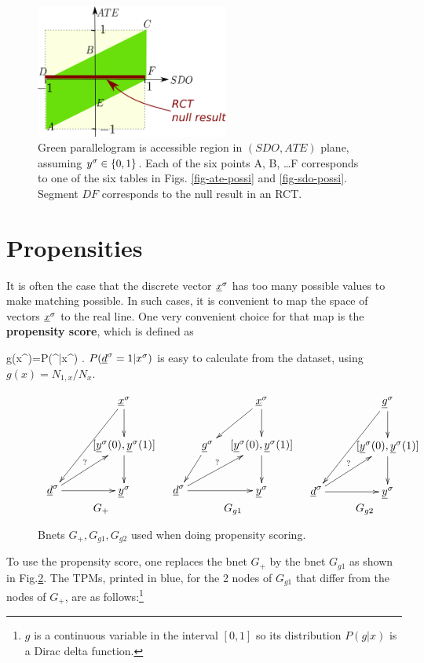 \begin{figure}[h!]
\centering
\includegraphics[width=2.5in]
{pot-out/sdo-ate-polytope.png}
\caption{
Green parallelogram
is accessible region in
$(SDO,ATE)$ plane,
assuming $y^\sigma\in \{0,1\}$.
Each of the
six points A, B, \ldots F
corresponds to one of the six tables
in Figs. \ref{fig-ate-possi}
and \ref{fig-sdo-possi}.
Segment $DF$
corresponds to the null
result in an RCT.
}
\label{fig-sdo-ate-polytope}
\end{figure}




\section{Propensities}\label{sec-propensities}

It is often the case
that the discrete vector $\rvx^\s$
has
too many possible values to make
matching possible.
In such cases, it
is convenient to
map the space
of vectors
$\rvx^\s$
to the real line.
One very
convenient choice
for that map
is the
{\bf propensity score},
which is defined as

\beq
g(x^\s)=P(\rvd^|x^\s)
\;.
\eeq
$P(\rvd^\s=1|x^\s)$ is easy to calculate
from the dataset, using $g(x)=N_{1,x}/N_x$.

\begin{figure}[h!]
$$
\begin{array}{ccc}
\xymatrix@C=.8pc{
&&\rvx^\s\ar[ddll]\ar[d]
\\
&&[\rvy^\s(0),\rvy^\s(1)]\ar[d]
\\
\rvd^\s\ar[urr]^?\ar[rr]
&
&\rvy^\s
}
&
\xymatrix@C=.8pc{
&&\rvx^\s\ar[dl]\ar[d]
\\
&\rvg^\s\ar[dl]
&[\rvy^\s(0),\rvy^\s(1)]\ar[d]
\\
\rvd^\s\ar[urr]^?\ar[rr]
&
&\rvy^\s
}
&
\xymatrix@C=.8pc{
&&\rvg^\s\ar[ddll]\ar[d]
\\
&&[\rvy^\s(0),\rvy^\s(1)]\ar[d]
\\
\rvd^\s\ar[urr]^?\ar[rr]
&
&\rvy^\s
}
\\
G_+&G_{g1}&G_{g2}
\end{array}
$$
\caption{Bnets $G_+, G_{g1}, G_{g2}$
used when doing propensity scoring.}
\label{fig-po-G-ps}
\end{figure}
To use the
propensity score,
one replaces the bnet $G_{+}$
by the bnet $G_{g1}$ as
shown in Fig.\ref{fig-po-G-ps}.
The TPMs, printed in blue,
for the 2 nodes of $G_{g1}$
that differ from the nodes
of $G_{+}$,
are as follows:\footnote{$g$ is a continuous variable
in the interval $[0,1]$
so its distribution
$P(g|x)$ is a Dirac delta function. }


